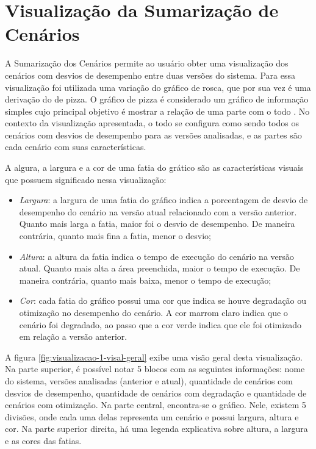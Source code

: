 \section{Visualização da Sumarização de Cenários} \label{sec:visualizacao1}

A Sumarização dos Cenários permite ao usuário obter uma visualização dos cenários com desvios de desempenho entre duas versões do sistema. Para essa visualização foi utilizada uma variação do gráfico de rosca, que por sua vez é uma derivação do de pizza. O gráfico de pizza é considerado um gráfico de informação simples cujo principal objetivo é mostrar a relação de uma parte com o todo \cite{Spence2005}. No contexto da visualização apresentada, o todo se configura como sendo todos os cenários com desvios de desempenho para as versões analisadas, e as partes são cada cenário com suas características.

A algura, a largura e a cor de uma fatia do grático são as características visuais que possuem significado nessa visualização:

\begin{itemize}
   \item \textit{Largura}: a largura de uma fatia do gráfico indica a porcentagem de desvio de desempenho do cenário na versão atual relacionado com a versão anterior. Quanto mais larga a fatia, maior foi o desvio de desempenho. De maneira contrária, quanto mais fina a fatia, menor o desvio;
   \item \textit{Altura}: a altura da fatia indica o tempo de execução do cenário na versão atual. Quanto mais alta a área preenchida, maior o tempo de execução. De maneira contrária, quanto mais baixa, menor o tempo de execução;
   \item \textit{Cor}: cada fatia do gráfico possui uma cor que indica se houve degradação ou otimização no desempenho do cenário. A cor marrom claro indica que o cenário foi degradado, ao passo que a cor verde indica que ele foi otimizado em relação a versão anterior.
\end{itemize}

A figura \ref{fig:visualizacao-1-visal-geral} exibe uma visão geral desta visualização. Na parte superior, é possível notar 5 blocos com as seguintes informações: nome do sistema, versões analisadas (anterior e atual), quantidade de cenários com desvios de desempenho, quantidade de cenários com degradação e quantidade de cenários com otimização. Na parte central, encontra-se o gráfico. Nele, existem 5 divisões, onde cada uma delas representa um cenário e possui largura, altura e cor. Na parte superior direita, há uma legenda explicativa sobre altura, a largura e as cores das fatias.

